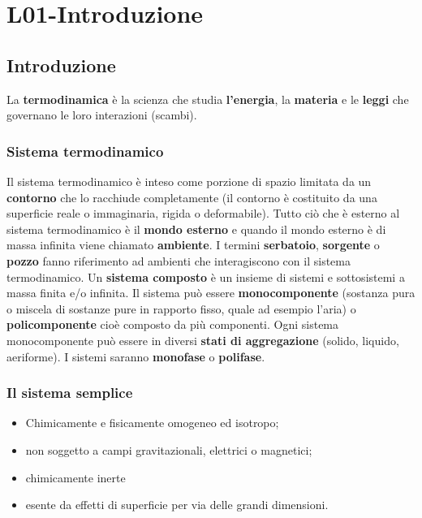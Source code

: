 \section{L01-Introduzione}
\subsection{Introduzione}
La \textbf{termodinamica} è la scienza che studia \textbf{l’energia}, la \textbf{materia} e le \textbf{leggi} che governano le loro interazioni (scambi).
\subsubsection{Sistema termodinamico}
Il sistema termodinamico è inteso come porzione di spazio limitata da un \textbf{contorno} che lo racchiude completamente (il contorno è costituito da una superficie reale o immaginaria, rigida o deformabile).\newline
\newline
Tutto ciò che è esterno al sistema termodinamico è il \textbf{mondo esterno} e quando il mondo esterno è di massa infinita viene chiamato \textbf{ambiente}.\newline
\newline
I termini \textbf{serbatoio}, \textbf{sorgente} o \textbf{pozzo} fanno riferimento ad ambienti che interagiscono con il sistema termodinamico.\newline
\newline
Un \textbf{sistema composto} è un insieme di sistemi e sottosistemi a massa finita e/o infinita.\newline
\newline
Il sistema può essere \textbf{monocomponente} (sostanza pura o miscela di sostanze pure in rapporto fisso, quale ad esempio l'aria) o \textbf{policomponente} cioè composto da più componenti.\newline
\newline
Ogni sistema monocomponente può essere in diversi \textbf{stati di aggregazione} (solido, liquido, aeriforme). I sistemi saranno \textbf{monofase} o \textbf{polifase}.
\subsubsection{Il sistema semplice}
\begin{itemize}
    \item Chimicamente e fisicamente omogeneo ed isotropo;
    \item non soggetto a campi gravitazionali, elettrici o magnetici;
    \item chimicamente inerte
    \item esente da effetti di superficie per via delle grandi dimensioni.
\end{itemize}
